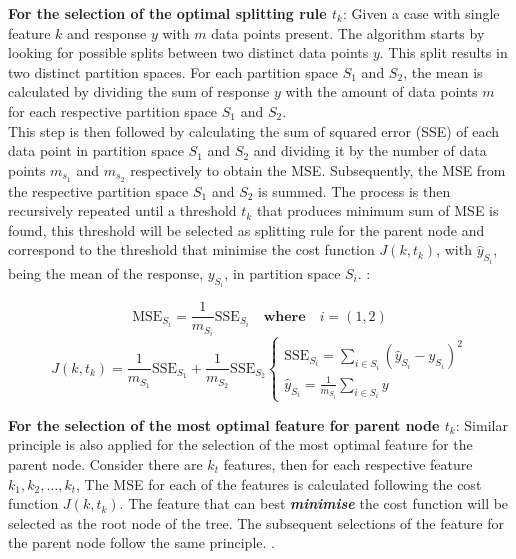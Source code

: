 \textbf{For the selection of the optimal splitting rule $t_k$}: Given a case with single feature $k$ and response $y$ with $m$ data points present. The algorithm starts by looking for possible splits between two distinct data points $y$. This split results in two distinct partition spaces. For each partition space $S_1$ and $S_2$, the mean is calculated by dividing the sum of response $y$ with the amount of data points $m$ for each respective partition space $S_1$ and $S_2$.\\ 

This step is then followed by calculating the sum of squared error (SSE) of each data point in partition space $S_1$ and $S_2$ and dividing it by the number of data points $m_{s_1}$ and $m_{s_2}$ respectively to obtain the MSE. Subsequently, the MSE from the respective partition space $S_1$ and $S_2$ is summed. The process is then recursively repeated until a threshold $t_k$ that produces minimum sum of MSE is found, this threshold will be selected as splitting rule for the parent node and correspond to the threshold that minimise the cost function $J(k,t_k)$, with $\hat{y}_{S_i}$, being the mean of the response, $y_{S_i}$, in partition space $S_i$. :

\begin{equation}\label{eqn:sse}
    \text{MSE}_{S_i} = \frac{1}{m_{S_i}}\text{SSE}_{S_i} \quad \textbf{where} \quad i = (1,2)   
\end{equation}
\begin{equation}\label{eqn:costfun}
    J(k,t_k) = \frac{1}{m_{S_1}}\text{SSE}_{S_1} + \frac{1}{m_{S_2}}\text{SSE}_{S_2}
    \begin{cases}
        \text{SSE}_{S_i} = \sum\limits_{i \in S_i}(\hat{y}_{S_i} - y_{S_i} )^2 \\
        \hat{y}_{S_i} = \frac{1}{m_{S_i}}\sum\limits_{i\in S_i} y
    \end{cases}  
\end{equation}

\textbf{For the selection of the most optimal feature for parent node $t_k$}: Similar principle is also applied for the selection of the most optimal feature for the parent node. Consider there are $k_t$ features, then for each respective feature $k_1,k_2,\dots,k_t$, The MSE for each of the features is calculated following the cost function $J(k,t_k)$. The feature that can best \emph{\textbf{minimise}} the cost function will be selected as the root node of the tree. The subsequent selections of the feature for the parent node follow the same principle. .\\

